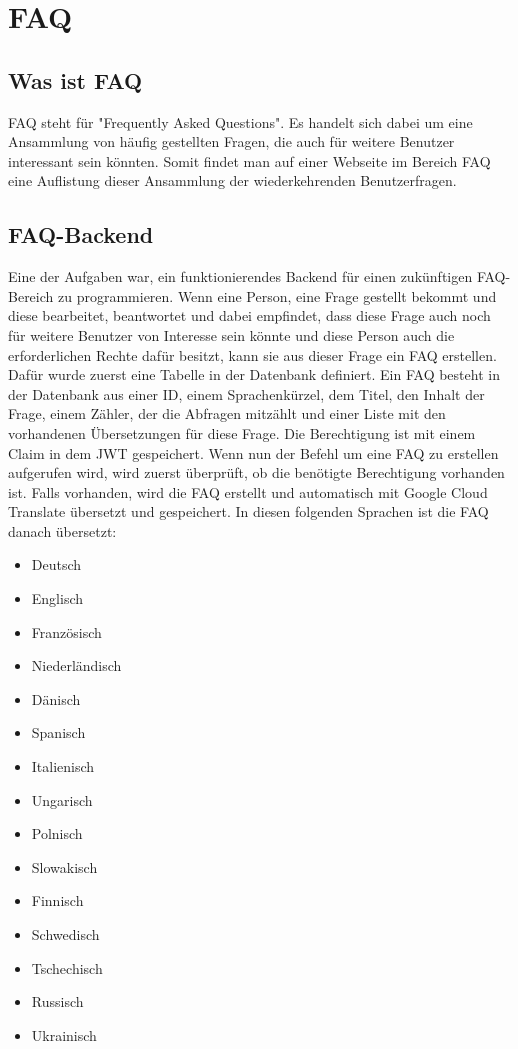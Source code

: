 \chapter{FAQ}
\section{Was ist FAQ}
FAQ steht für "Frequently Asked Questions". Es handelt sich dabei um eine Ansammlung von häufig gestellten Fragen, die auch für weitere Benutzer interessant sein könnten. Somit findet man auf einer Webseite im Bereich FAQ eine Auflistung dieser Ansammlung der wiederkehrenden Benutzerfragen.
\section{FAQ-Backend}
Eine der Aufgaben war, ein funktionierendes Backend für einen zukünftigen FAQ-Bereich zu programmieren. Wenn eine Person, eine Frage gestellt bekommt und diese bearbeitet, beantwortet und dabei empfindet, dass diese Frage auch noch für weitere Benutzer von Interesse sein könnte und diese Person auch die erforderlichen Rechte dafür besitzt, kann sie aus dieser Frage ein FAQ erstellen.\\
Dafür wurde zuerst eine Tabelle in der Datenbank definiert. Ein FAQ besteht in der Datenbank aus einer ID, einem Sprachenkürzel, dem Titel, den Inhalt der Frage, einem Zähler, der die Abfragen mitzählt und einer Liste mit den vorhandenen Übersetzungen für diese Frage. Die Berechtigung ist mit einem Claim in dem JWT gespeichert. Wenn nun der Befehl um eine FAQ zu erstellen aufgerufen wird, wird zuerst überprüft, ob die benötigte Berechtigung vorhanden ist. Falls vorhanden, wird die FAQ erstellt und automatisch mit Google Cloud Translate übersetzt und gespeichert. In diesen folgenden Sprachen ist die FAQ danach übersetzt:
\begin{multicols}{2}
	\begin{itemize}
		\item Deutsch
		\item Englisch
		\item Französisch
		\item Niederländisch
		\item Dänisch
		\item Spanisch
		\item Italienisch
		\item Ungarisch
		\item Polnisch
		\item Slowakisch
		\item Finnisch
		\item Schwedisch
		\item Tschechisch
		\item Russisch
		\item Ukrainisch
	\end{itemize}
\end{multicols}